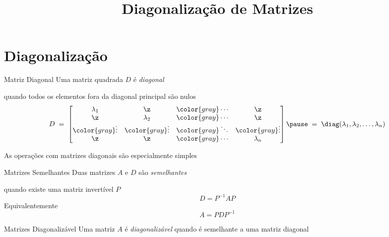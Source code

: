 \documentclass[fleqn,aspectratio=169,12pt]{beamer}
\title{Diagonalização de Matrizes}
\begin{document}
\addtitle

\section{Diagonalização}

\begin{frame}{Matriz Diagonal}
  Uma matriz quadrada \(D\) é \emph{diagonal}

  \pause
  quando todos os elementos fora da diagonal principal são nulos
  \pause
  \[
    D \;=\;
    \begin{bmatrix}
      \lambda_{1}          & \z                   & {\color{gray}\cdots} & \z                   \\
      \z                   & \lambda_{2}          & {\color{gray}\cdots} & \z                   \\
      {\color{gray}\vdots} & {\color{gray}\vdots} & {\color{gray}\ddots} & {\color{gray}\vdots} \\
      \z                   & \z                   & {\color{gray}\cdots} & \lambda_{n}
    \end{bmatrix}
    \pause
    \;=\; \diag(\lambda_{1}, \lambda_{2}, \ldots, \lambda_{n})
  \]

  \bigskip
  \pause
  As operações com matrizes diagonais são especialmente simples
\end{frame}

\begin{frame}{Matrizes Semelhantes}
  Duas matrizes \(A\) e \(D\) são \emph{semelhantes}

  \pause
  quando existe uma matriz invertível \(P\)
  \pause
  \[
    D = P^{-1} A P
  \]
  \pause
  Equivalentemente
  \[
    A = P D P^{-1}
  \]
\end{frame}

\begin{frame}{Matrizes Diagonalizável}
  Uma matriz \(A\) é \emph{diagonalizável} quando é semelhante a uma matriz diagonal
\end{frame}
\end{document}
